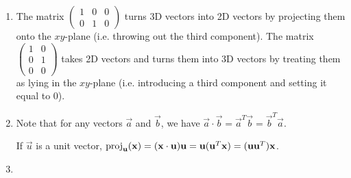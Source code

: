 \begin{enumerate}
\begin{enumerate}
\item The matrix $\begin{pmatrix} 1 & 0 & 0 \\ 0 & 1 & 0 \end{pmatrix}$ turns 3D vectors into 2D vectors by projecting them onto the $xy$-plane (i.e. throwing out the third component). The matrix $\begin{pmatrix} 1 & 0 \\ 0 & 1 \\ 0 & 0 \end{pmatrix}$ takes 2D vectors and turns them into 3D vectors by treating them as lying in the $xy$-plane (i.e. introducing a third component and setting it equal to 0).
\item Note that for any vectors $\vec{a}$ and $\vec{b}$, we have $\vec{a}\cdot\vec{b} = \vec{a}^T\vec{b} = \vec{b}^T\vec{a}$.\par
If $\vec{u}$ is a unit vector, $\operatorname{proj}_{\mathbf{u}}(\mathbf{x}) = (\mathbf{x}\cdot\mathbf{u})\mathbf{u} = \mathbf{u}(\mathbf{u}^T\mathbf{x}) = (\mathbf{uu}^T)\mathbf{x}$.
\item 
\end{enumerate}
\end{enumerate}